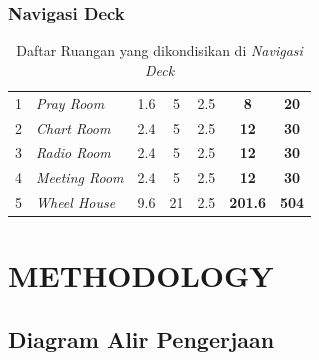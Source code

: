 \documentclass[12pt,a4paper,twoside,openright]{book}
\theoremstyle{definition}
\theoremstyle{plain}
\theoremstyle{remark}
\begin{document}
\subsection*{Navigasi Deck}

\begin{table}[H]
\centering
\caption{Daftar Ruangan yang dikondisikan di \textit{Navigasi Deck}}
\footnotesize
\begin{tabularx}{\textwidth}{|c|X|c|c|c|c|c|}
\hline
\rowcolor{tableheader}
\multicolumn{2}{|c|}{\textbf{Navigation Deck}} & & & & & \\
\hline
1 & \textit{Pray Room} & 1.6 & 5 & 2.5 & \textbf{8} & \textbf{20} \\
\hline
2 & \textit{Chart Room} & 2.4 & 5 & 2.5 & \textbf{12} & \textbf{30} \\
\hline
3 & \textit{Radio Room} & 2.4 & 5 & 2.5 & \textbf{12} & \textbf{30} \\
\hline
4 & \textit{Meeting Room} & 2.4 & 5 & 2.5 & \textbf{12} & \textbf{30} \\
\hline
5 & \textit{Wheel House} & 9.6 & 21 & 2.5 & \textbf{201.6} & \textbf{504} \\
\hline
\end{tabularx}
\end{table}


\chapter{METHODOLOGY}

\section{Diagram Alir Pengerjaan}
\end{document}
